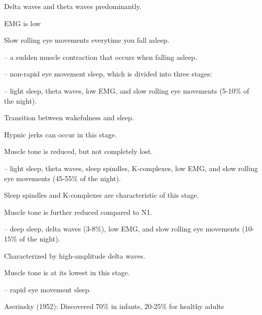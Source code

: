 \begin{coloredlist}
    \item Delta waves and theta waves predominantly.
    \item EMG is low
    \item Slow rolling eye movements everytime you fall asleep.
    \item {} -- a sudden muscle contraction that occurs when falling asleep.
    \item {} -- non-rapid eye movement sleep, which is divided into three stages:
    \begin{coloredlist}
        \item {} -- light sleep, theta waves, low EMG, and slow rolling eye movements (5-10\% of the night).
        \begin{coloredlist}
            \item Transition between wakefulness and sleep.
            \item Hypnic jerks can occur in this stage.
            \item Muscle tone is reduced, but not completely lost.
        \end{coloredlist}
        \item {} -- light sleep, theta waves, sleep spindles, K-complexes, low EMG, and slow rolling eye movements (45-55\% of the night).
        \begin{coloredlist}
            \item Sleep spindles and K-complexes are characteristic of this stage.
            \item Muscle tone is further reduced compared to N1.
        \end{coloredlist}
        \item {} -- deep sleep, delta waves (3-8\%), low EMG, and slow rolling eye movements (10-15\% of the night).
        \begin{coloredlist}
            \item Characterized by high-amplitude delta waves.
            \item Muscle tone is at its lowest in this stage.
        \end{coloredlist}
    \end{coloredlist}
    \item {} -- rapid eye movement sleep.
    \begin{coloredlist}
        \item Aserinsky (1952): Discovered 70\% in infants, 20-25\% for healthy adults

\end{coloredlist}
\end{coloredlist}

